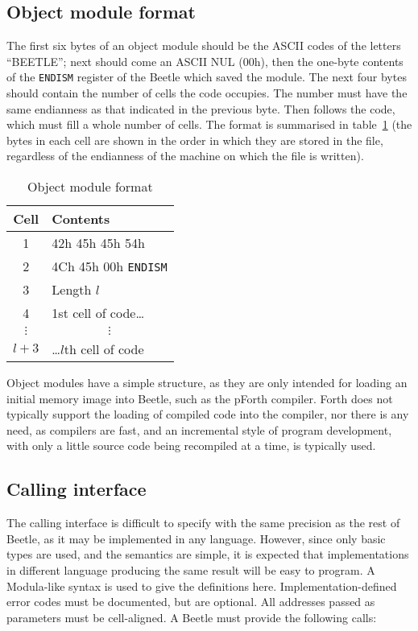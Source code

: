\documentclass{article}
\begin{document}
\subsection{Object module format}
\label{object}

The first six bytes of an object module should be the ASCII codes of the letters
``BEETLE''; next should come an ASCII NUL (00h), then the one-byte contents of
the {\tt ENDISM} register of the Beetle which saved the module. The next four
bytes should contain the number of cells the code occupies. The number must have
the same endianness as that indicated in the previous byte. Then follows the
code, which must fill a whole number of cells. The format is summarised in table~\ref{objecttable}
(the bytes in each cell are shown in the order in which they
are stored in the file, regardless of the endianness of the machine on which the
file is written).

\begin{table}[htbp]
\begin{center}
\begin{tabular}{cl} \toprule
\bf Cell & \bf Contents \\ \midrule
1 & 42h 45h 45h 54h \\
2 & 4Ch 45h 00h {\tt ENDISM} \\
3 & Length $l$\/ \\
4 & 1st cell of code\dots \\
$\vdots$ & \multicolumn{1}{c}{$\vdots$} \\
$l+3$\/ & \dots$l$\/th cell of code \\ \bottomrule
\end{tabular}
\caption{\label{objecttable}Object module format}
\end{center}
\end{table}

Object modules have a simple structure, as they are only intended for loading an
initial memory image into Beetle, such as the pForth compiler. Forth does not
typically support the loading of compiled code into the compiler, nor there is
any need, as compilers are fast, and an incremental style of program
development, with only a little source code being recompiled at a time, is
typically used.


\subsection{Calling interface}
\label{calls}

The calling interface is difficult to specify with the same precision as the
rest of Beetle, as it may be implemented in any language. However, since only
basic types are used, and the semantics are simple, it is expected that
implementations in different language producing the same result will be easy to
program. A Modula-like syntax is used to give the definitions here.
Implementation-defined error codes must be documented, but are optional. All
addresses passed as parameters must be cell-aligned. A Beetle must provide the
following calls:
\end{document}
